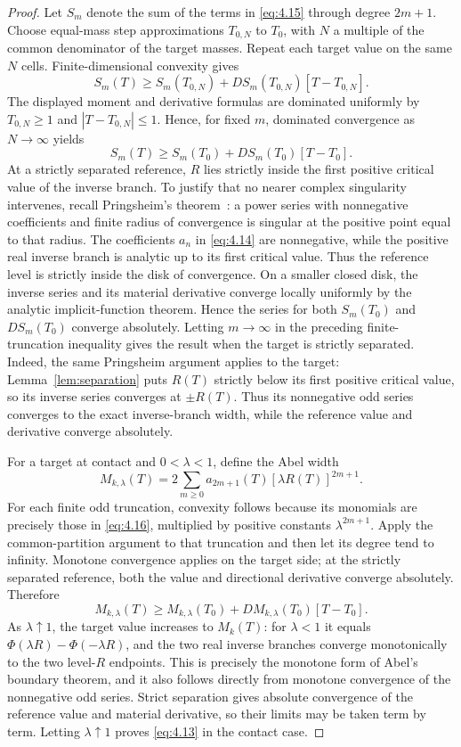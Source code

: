 \documentclass[11pt]{article}
\numberwithin{equation}{section}
\theoremstyle{plain}
\theoremstyle{definition}
\theoremstyle{remark}
\newcommand{\1}{\mathbf 1}
\begin{document}
\begin{proof}
Let $S_m$ denote the sum of the terms in \eqref{eq:4.15} through degree $2m+1$.
Choose equal-mass step approximations $T_{0,N}$ to $T_0$, with $N$ a
multiple of the common denominator of the target masses.  Repeat each
target value on the same $N$ cells.  Finite-dimensional convexity gives
\[
 S_m(T)\ge
 S_m(T_{0,N})+DS_m(T_{0,N})[T-T_{0,N}].
\]
The displayed moment and derivative formulas are dominated uniformly by
$T_{0,N}\ge1$ and $|T-T_{0,N}|\le1$.  Hence, for fixed $m$, dominated
convergence as $N\to\infty$ yields
\[
 S_m(T)\ge S_m(T_0)+DS_m(T_0)[T-T_0].
\]
At a strictly separated reference, $R$ lies strictly inside the first
positive critical value of the inverse branch.  To justify that no nearer
complex singularity intervenes, recall Pringsheim's
theorem~\cite[Theorem IV.6]{FlajoletSedgewick2009}: a power series with
nonnegative coefficients and finite radius of convergence is singular at
the positive point equal to that radius.  The coefficients $a_n$ in
\eqref{eq:4.14} are nonnegative, while the positive real inverse branch is analytic
up to its first critical value.  Thus the reference level is strictly
inside the disk of convergence.  On a smaller closed disk, the inverse
series and its material derivative converge locally uniformly by the
analytic implicit-function theorem.  Hence the series for both
$S_m(T_0)$ and $DS_m(T_0)$ converge absolutely.  Letting $m\to\infty$
in the preceding finite-truncation inequality gives the result when the
target is strictly separated.  Indeed, the same Pringsheim argument applies
to the target: Lemma~\ref{lem:separation} puts $R(T)$ strictly below its
first positive critical value, so its inverse series converges at
$\pm R(T)$.  Thus its nonnegative odd series converges to the exact
inverse-branch width, while the reference value and derivative converge
absolutely.

For a target at contact and $0<\lambda<1$, define
the Abel width
\[
 M_{k,\lambda}(T)=2\sum_{m\ge0}a_{2m+1}(T)
 [\lambda R(T)]^{2m+1}.
\]
For each finite odd truncation, convexity follows because its monomials are
precisely those in \eqref{eq:4.16}, multiplied by positive constants
$\lambda^{2m+1}$.  Apply the common-partition argument to that truncation
and then let its degree tend to infinity.  Monotone convergence applies on
the target side; at the strictly separated reference, both the value and
directional derivative converge absolutely.  Therefore
\[
 M_{k,\lambda}(T)\ge M_{k,\lambda}(T_0)
 +DM_{k,\lambda}(T_0)[T-T_0].
\]
As $\lambda\uparrow1$, the target value increases to $M_k(T)$: for
$\lambda<1$ it equals
$\Phi(\lambda R)-\Phi(-\lambda R)$, and the two real inverse branches
converge monotonically to the two level-$R$ endpoints.  This is precisely
the monotone form of Abel's boundary theorem, and it also follows directly
from monotone convergence of the nonnegative odd series.  Strict
separation gives absolute convergence of the reference value and material
derivative, so their limits may be taken term by term.  Letting
$\lambda\uparrow1$ proves \eqref{eq:4.13} in the contact case.
\end{proof}
\end{document}

